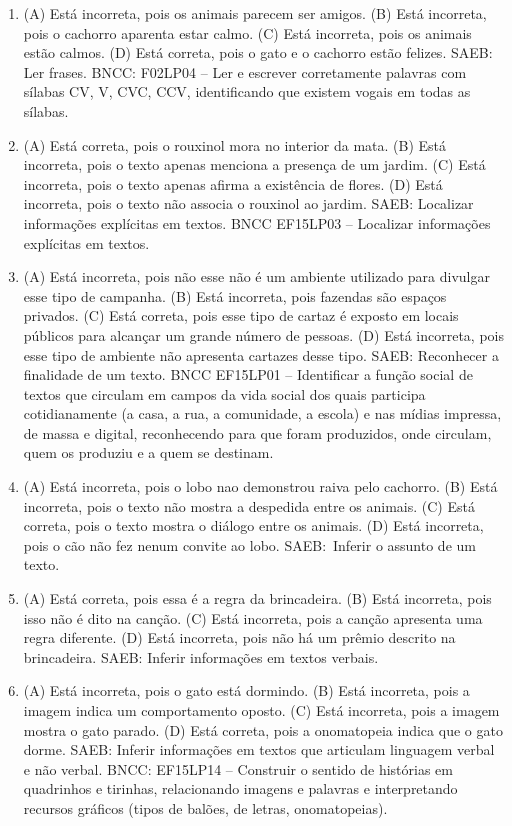 \begin{enumerate}
\item
(A) Está incorreta, pois os animais parecem ser amigos.
(B) Está incorreta, pois o cachorro aparenta estar calmo.
(C) Está incorreta, pois os animais estão calmos.
(D) Está correta, pois o gato e o cachorro estão felizes.
SAEB: Ler frases.
BNCC: F02LP04 -- Ler e escrever corretamente palavras com sílabas
CV, V, CVC, CCV, identificando que existem vogais em todas as sílabas.

\item
(A) Está correta, pois o rouxinol mora no interior da mata.
(B) Está incorreta, pois o texto apenas menciona a presença de um jardim.
(C) Está incorreta, pois o texto apenas afirma a existência de flores.
(D) Está incorreta, pois o texto não associa o rouxinol ao jardim.
SAEB: Localizar informações explícitas em textos.
BNCC EF15LP03 -- Localizar informações explícitas em textos.

\item
(A) Está incorreta, pois não esse não é um ambiente utilizado para divulgar esse tipo de campanha.
(B) Está incorreta, pois fazendas são espaços privados.
(C) Está correta, pois esse tipo de cartaz é exposto em locais
públicos para alcançar um grande número de pessoas.
(D) Está incorreta, pois esse tipo de ambiente não apresenta cartazes desse tipo.
SAEB: Reconhecer a finalidade de um texto.
BNCC EF15LP01 -- Identificar a função social de textos que circulam em
campos da vida social dos quais participa cotidianamente (a casa, a rua,
a comunidade, a escola) e nas mídias impressa, de massa e digital,
reconhecendo para que foram produzidos, onde circulam, quem os produziu
e a quem se destinam.

\item
(A) Está incorreta, pois o lobo nao demonstrou raiva pelo cachorro.
(B) Está incorreta, pois o texto não mostra a despedida entre os animais.
(C) Está correta, pois o texto mostra o diálogo entre os animais.
(D) Está incorreta, pois o cão não fez nenum convite ao lobo.
SAEB:~Inferir o assunto de um texto.

\item
(A) Está correta, pois essa é a regra da brincadeira.
(B) Está incorreta, pois isso não é dito na canção.
(C) Está incorreta, pois a canção apresenta uma regra diferente.
(D) Está incorreta, pois não há um prêmio descrito na brincadeira.
SAEB: Inferir informações em textos verbais.

\item
(A) Está incorreta, pois o gato está dormindo.
(B) Está incorreta, pois a imagem indica um comportamento oposto.
(C) Está incorreta, pois a imagem mostra o gato parado.
(D) Está correta, pois a onomatopeia indica que o gato dorme.
SAEB: Inferir informações em textos que articulam linguagem verbal e não verbal.
BNCC: EF15LP14 -- Construir o sentido de histórias em quadrinhos
e tirinhas, relacionando imagens e palavras e interpretando recursos
gráficos (tipos de balões, de letras, onomatopeias).


\end{enumerate}
